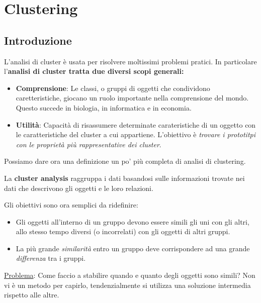 \pagestyle{fancy}
\cfoot{\thepage}
\renewcommand{\footrulewidth}{0.25pt}


 
\section{Clustering}
\subsection{Introduzione}

L'analisi di cluster è usata per risolvere moltissimi problemi pratici. In particolare l'\textbf{analisi di cluster tratta due diversi scopi generali:}

\begin{itemize}
	\item \textbf{Comprensione}: Le classi, o gruppi di oggetti che condividono caretteristiche, giocano un ruolo importante nella comprensione del mondo. Questo succede in biologia, in informatica e in economia.
	\item \textbf{Utilità}: Capacità di risassumere determinate carateristiche di un oggetto con le caratteristiche del cluster a cui appartiene. L'obiettivo è \textit{trovare i prototitpi con le proprietà più rappresentative dei cluster}.
\end{itemize}

Possiamo dare ora una definizione un po' più completa di analisi di clustering.
\begin{defn}
	La \textbf{cluster analysis} raggruppa i dati basandosi sulle informazioni trovate nei dati che descrivono gli oggetti e le loro relazioni.
\end{defn}

Gli obiettivi sono ora semplici da ridefinire:
\begin{itemize}
	\item Gli oggetti all'interno di un gruppo devono essere simili gli uni con gli altri, allo stesso tempo diversi (o incorrelati) con gli oggetti di altri gruppi.
	\item La più grande \textit{similarità} entro un gruppo deve corrispondere ad una grande \textit{differenza} tra i gruppi. 
\end{itemize}

\underline{Problema}: Come faccio a stabilire quando  e quanto degli oggetti sono simili? Non vi è un metodo per capirlo, tendenzialmente si utilizza una soluzione intermedia rispetto alle altre. 

